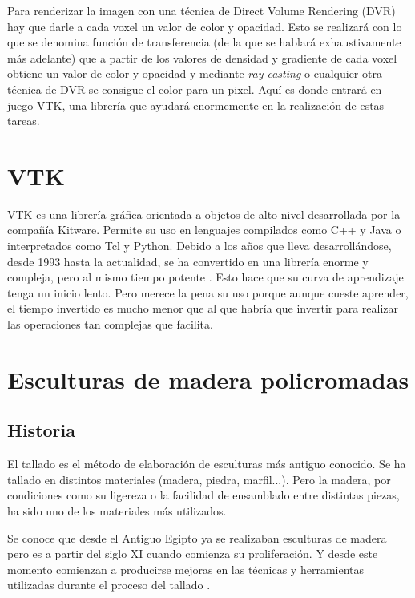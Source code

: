Para renderizar la imagen con una técnica de Direct Volume Rendering (DVR) hay que darle a cada voxel un valor de color y opacidad. Esto se realizará con lo que se denomina función de transferencia (de la que se hablará exhaustivamente más adelante) que a partir de los valores de densidad y gradiente de cada voxel obtiene un valor de color y opacidad y mediante \textit{ray casting} o cualquier otra técnica de DVR se consigue el color para un pixel. Aquí es donde entrará en juego VTK, una librería que ayudará enormemente en la realización de estas tareas.

\section{VTK} 

VTK es una librería gráfica orientada a objetos de alto nivel desarrollada por la compañía Kitware. Permite su uso en lenguajes compilados como C++ y Java o interpretados como Tcl y Python. Debido a los años que lleva desarrollándose, desde 1993 hasta la actualidad, se ha convertido en una librería enorme y compleja, pero al mismo tiempo potente \cite{intro_medical_vtk_bioimage}. Esto hace que su curva de aprendizaje tenga un inicio lento. Pero merece la pena su uso porque aunque cueste aprender, el tiempo invertido es mucho menor que al que habría que invertir para realizar las operaciones tan complejas que facilita.

\section{Esculturas de madera policromadas}

\subsection{Historia}

El tallado es el método de elaboración de esculturas más antiguo conocido. Se ha tallado en distintos materiales (madera, piedra, marfil...). Pero la madera, por condiciones como su ligereza o la facilidad de ensamblado entre distintas piezas, ha sido uno de los materiales más utilizados.

Se conoce que desde el Antiguo Egipto ya se realizaban esculturas de madera pero es a partir del siglo XI cuando comienza su proliferación. Y desde este momento comienzan a producirse mejoras en las técnicas y herramientas utilizadas durante el proceso del tallado \cite{tc_esculturas}.

